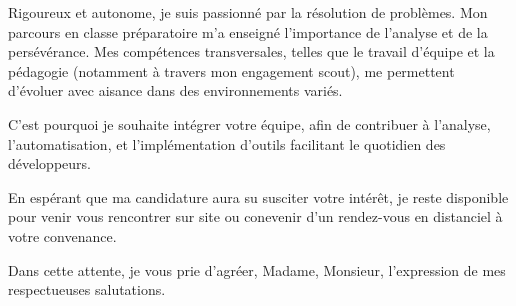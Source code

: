 \documentclass[a4paper,10pt]{article}
\begin{document}
Rigoureux et autonome, je suis passionné par la résolution de problèmes. Mon parcours en classe préparatoire m'a enseigné l'importance de l'analyse et de la persévérance. Mes compétences transversales, telles que le travail d'équipe et la pédagogie (notamment à travers mon engagement scout), me permettent d'évoluer avec aisance dans des environnements variés.

\vspace{2.5mm}
C'est pourquoi je souhaite intégrer votre équipe, afin de contribuer à l'analyse, l'automatisation, et l'implémentation d'outils facilitant le quotidien des développeurs.

\vspace{2.5mm}
En espérant que ma candidature aura su susciter votre intérêt, je reste disponible pour venir vous rencontrer sur site ou conevenir d'un rendez-vous en distanciel à votre convenance.

\vspace{2.5mm}
Dans cette attente, je vous prie d'agréer, Madame, Monsieur, l'expression de mes respectueuses salutations.
\end{document}
